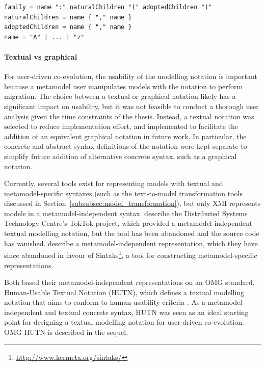 \begin{lstlisting}[caption=A metamodel-specific syntax for families in EBNF, label=lst:mms_syntax, language=EBNF]
family = name ":" naturalChildren "(" adoptedChildren ")"
naturalChildren = name { "," name }
adoptedChildren = name { "," name }
name = "A" | ... | "z"
\end{lstlisting}

\paragraph{Textual vs graphical} For user-driven co-evolution, the usability of the modelling notation is important because a metamodel user manipulates models with the notation to perform migration. The choice between a textual or graphical notation likely has a significant impact on usability, but it was not feasible to conduct a thorough user analysis given the time constraints of the thesis. Instead, a textual notation was selected to reduce implementation effort, and implemented to facilitate the addition of an equivalent graphical notation in future work. In particular, the concrete and abstract syntax definitions of the notation were kept separate to simplify future addition of alternative concrete syntax, such as a graphical notation.

Currently, several tools exist for representing models with textual and metamodel-specific syntaxes (such as the text-to-model transformation tools discussed in Section~\ref{subsubsec:model_transformation}), but only XMI represents models in a metamodel-independent syntax. \cite{steel01hutn} describe the Distributed Systems Technology Centre's TokTok project, which provided a me\-ta\-mo\-del-inde\-pe\-nd\-ent textual modelling notation, but the tool has been abandoned and the source code has vanished. \cite{muller05hutn} describe a me\-ta\-mo\-del-inde\-pe\-nd\-ent representation, which they have since abandoned in favour of Sintaks\footnote{\url{http://www.kermeta.org/sintaks/}}, a tool for constructing metamodel-specific representations.

Both \cite{steel01hutn,muller05hutn} based their me\-ta\-mo\-del-independent representations on an OMG standard, Human-Usable Textual Notation (HUTN), which defines a textual modelling notation that aims to conform to human-usability criteria \cite{hutn}. As a me\-ta\-mo\-del-inde\-pe\-nd\-ent and textual concrete syntax, HUTN was seen as an ideal starting point for designing a textual modelling notation for user-driven co-evolution. OMG HUTN is described in the sequel.

